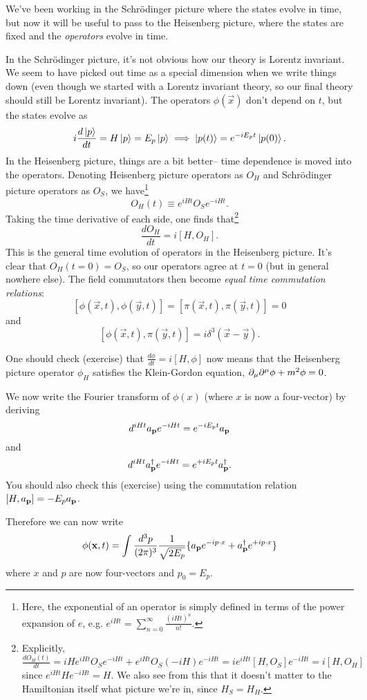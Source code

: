 We've been working in the Schr\"odinger picture where the states evolve in time, but now it will be useful to pass to the Heisenberg picture, where the states are fixed and the \emph{operators} evolve in time.

In the Schr\"odinger picture, it's not obvious how our theory is Lorentz invariant. We seem to have picked out time as a special dimension when we write things down (even though we started with a Lorentz invariant theory, so our final theory should still be Lorentz invariant). The operators $\phi(\vec x)$ don't depend on $t$, but the states evolve as
$$i \frac{d\left| p \right>}{dt}=H\left| p \right> = E_p\left| p \right> \implies \left| p(t) \right>= e^{-i E_pt} \left| p(0) \right>.$$
In the Heisenberg picture, things are a bit better-- time dependence is moved into the operators. Denoting Heisenberg picture operators as $O_H$ and Schr\"odinger picture operators as $O_S$, we have\footnote{Here, the exponential of an operator is simply defined in terms of the power expansion of $e$, e.g. $e^{iHt}=\sum_{n=0}^\infty \frac{(iHt)^n}{n!}$.}
$$O_H(t) \equiv e^{iHt}O_S e^{-iHt}.$$
Taking the time derivative of each side, one finds that\footnote{Explicitly, $\frac{d O_H(t)}{dt}= iH e^{iHt} O_S e^{-iHt}+e^{iHt}O_S (-iH) e^{-iHt} = i e^{iHt} [H,O_S] e^{-iHt} = i[H,O_H]$ since $e^{iHt}H e^{-iHt}=H$. We also see from this that it doesn't matter to the Hamiltonian itself what picture we're in, since $H_S=H_H$.}
$$\frac{dO_H}{dt}=i[H,O_H].$$
This is the general time evolution of operators in the Heisenberg picture. It's clear that $O_H(t=0)=O_S$, so our operators agree at $t=0$ (but in general nowhere else). The field commutators then become \emph{equal time commutation relations}:
$$[\phi(\vec x,t),\phi(\vec y, t)]=[\pi(\vec x, t), \pi(\vec y,t)]=0$$
and
$$[\phi(\vec x, t), \pi (\vec y, t)]=i \delta^3(\vec x-\vec y).$$

\begin{ex}\label{heisenbergkleingordon}
One should check (exercise) that $\frac{d\phi}{dt}=i[H,\phi]$ now means that the Heisenberg picture operator $\phi_H$ satisfies the Klein-Gordon equation, $\partial_\mu \partial^\mu \phi+ m^2 \phi=0$.
\end{ex}
We now write the Fourier transform of $\phi(x)$ (where $x$ is now a four-vector) by deriving
$$d^{iHt}a_{\boldsymbol{\mathbf{p}}} e^{-iHt}=e^{-iE_p t} a_{\boldsymbol{\mathbf{p}}}$$
and
$$d^{iHt}a_{\boldsymbol{\mathbf{p}}}^\dagger e^{-iHt}=e^{+iE_p t} a_{\boldsymbol{\mathbf{p}}}^\dagger.$$
You should also check this (exercise) using the commutation relation $[H,a_{\boldsymbol{\mathbf{p}}}]=-E_p a_{\boldsymbol{\mathbf{p}}}$.

Therefore we can now write
$$\phi(\boldsymbol{\mathbf{x}}, t)=\int \frac{d^3p}{(2\pi)^3} \frac{1}{\sqrt{2E_p}} \{ a_{\boldsymbol{\mathbf{p}}} e^{-i p\cdot x}+a_{\boldsymbol{\mathbf{p}}}^\dagger e^{+i p\cdot x}\}$$
where $x$ and $p$ are now four-vectors and $p_0= E_p$.


